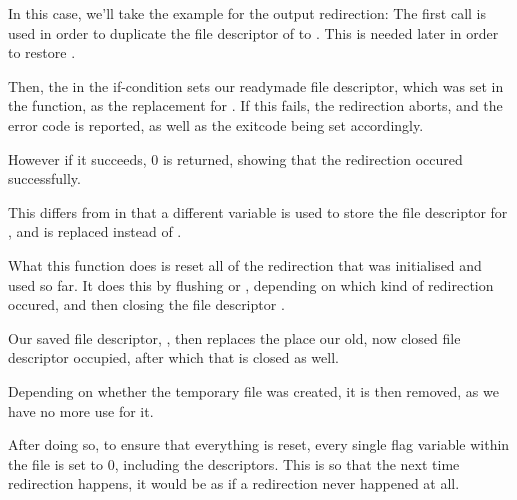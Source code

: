 \documentclass[12pt, a4paper]{report}
\begin{document}
                In this case, we'll take the example for the output redirection:
                \begingroup
                    \fontsize{10pt}{10pt}\selectfont
                \endgroup
                The first  call is used in order to duplicate the file
                descriptor of  to . This is needed later
                in order to restore .

                Then, the  in the if-condition sets our readymade 
                file descriptor, which was set in the  function,
                as the replacement for . If this fails, the redirection
                aborts, and the error code is reported, as well as the exitcode 
                being set accordingly.

                However if it succeeds, 0 is returned, showing that the redirection
                occured successfully. 

                This differs from  in that a different variable is used 
                to store the file descriptor for , and  is 
                replaced instead of .

                \clearpage

                What this function does is reset all of the redirection that
                was initialised and used so far. It does this by flushing
                 or , depending on which kind of redirection
                occured, and then closing the file descriptor .

                Our saved file descriptor, , then replaces
                the place our old, now closed file descriptor occupied, after which
                that is closed as well.

                Depending on whether the temporary file was created, it is then
                removed, as we have no more use for it.

                After doing so, to ensure that everything is reset, every single
                flag variable within the file is set to 0, including the
                 descriptors. This is so that the next time
                redirection happens, it would be as if a redirection never happened
                at all.

                \clearpage

        \section{}
\end{document}
